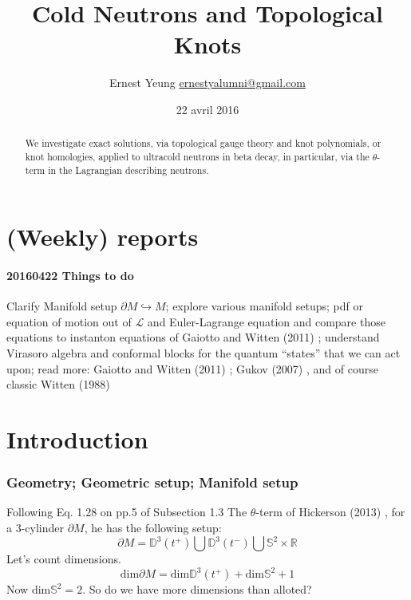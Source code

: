 \documentclass[10pt]{amsart}
\title{Cold Neutrons and Topological Knots}
\author{Ernest Yeung \href{mailto:ernestyalumni@gmail.com}{ernestyalumni@gmail.com}}
\date{22 avril 2016}
\begin{document}

\maketitle

\tableofcontents


\begin{abstract}
We investigate exact solutions, via topological gauge theory and knot polynomials, or knot homologies, applied to ultracold neutrons in beta decay, in particular, via the $\theta$-term in the Lagrangian describing neutrons.  
\end{abstract}


\part{(Weekly) reports}

\subsection{20160422 Things to do}

Clarify Manifold setup $\partial M \hookrightarrow M$; explore various manifold setups; pdf or equation of motion out of $\mathcal{L}$ and Euler-Lagrange equation and compare those equations to instanton equations of Gaiotto and Witten (2011) \cite{GW2011}; understand Virasoro algebra and conformal blocks for the quantum ``states'' that we can act upon; read more: Gaiotto and Witten (2011) \cite{GW2011}; Gukov (2007) \cite{Guko2007}, and of course classic Witten (1988) \cite{Witten:1988hf}

\part{Introduction}

\section{Geometry; Geometric setup; Manifold setup}

Following Eq. 1.28 on pp.5 of Subsection 1.3 The $\theta$-term of Hickerson (2013) \cite{Hick2013}, for a 3-cylinder $\partial M$, he has the following setup:
\[
\partial M = \mathbb{D}^3(t^+) \bigcup \mathbb{D}^3(t^-) \bigcup \mathbb{S}^2 \times \mathbb{R}
\]
Let's count dimensions.  
\[
\text{dim} \partial M  = \text{dim} \mathbb{D}^3(t^+) + \text{dim}\mathbb{S}^2 + 1 
\]
Now $\text{dim}\mathbb{S}^2 =2$.  So do we have more dimensions than alloted?  
\end{document}
